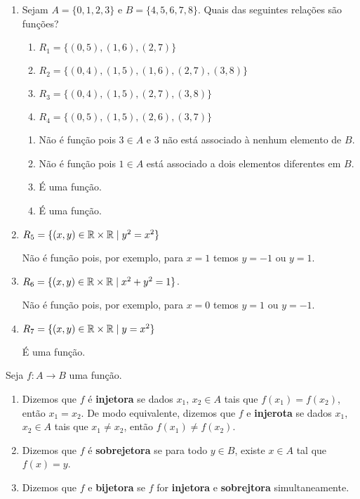 \begin{exemplos}
	\begin{enumerate}[label={\arabic*})]
	\item Sejam $A = \{0,1,2,3\}$ e $B = \{4,5,6,7,8\}$. Quais das seguintes rela{\c c}{\~o}es s{\~a}o fun{\c c}{\~o}es?
	\begin{enumerate}[label={\alph*})]
		\item $R_{1} = \{(0,5),(1,6),(2,7)\}$
		\item $R_{2} = \{(0,4),(1,5),(1,6),(2,7),(3,8)\}$
		\item $R_{3} = \{(0,4),(1,5),(2,7),(3,8)\}$
		\item $R_{4} = \{(0,5),(1,5),(2,6),(3,7)\}$
	\end{enumerate}
	\begin{solucao}
		\begin{enumerate}[label={\alph*})]
			\item Não é função pois $3 \in A$ e $3$ não está associado {\`a} nenhum elemento de $B$.
			\item Não é função pois $1 \in A$ está associado a dois elementos diferentes em $B$.
			\item É uma função.
			\item É uma função.
		\end{enumerate}
	\end{solucao}
	\item $R_{5} = \{(x,y) \in \mathbb{R}  \times \mathbb{R}  \mid y^2 = x^2\}$
	\begin{solucao}
	 	Não é função pois, por exemplo, para $x = 1$ temos $y = -1$ ou $y = 1$.
	 \end{solucao}
	\item $R_{6} = \{(x,y) \in \mathbb{R}  \times \mathbb{R}  \mid x^2 + y^2 = 1\}$.
	\begin{solucao}
	 	Não é função pois, por exemplo, para $x = 0$ temos $y = 1$ ou $y = -1$.
	 \end{solucao}
	\item  $R_{7} = \{(x,y) \in \mathbb{R}  \times \mathbb{R} \mid y = x^2\}$
	\begin{solucao}
	 	É uma função.
	\end{solucao}
	\end{enumerate}	
\end{exemplos}


\begin{definicao}
	Seja $f : A \to B$ uma função.
	\begin{enumerate}
		\item Dizemos que $f$ é \textbf{injetora} se dados $x_1$, $x_2 \in A$ tais que $f(x_1) = f(x_2)$, então $x_1 = x_2$. De modo equivalente, dizemos que $f$ e \textbf{injerota} se dados $x_1$, $x_2 \in A$ tais que $x_1 \ne x_2$, então $f(x_1) \ne f(x_2)$.
		\item Dizemos que $f$ é \textbf{sobrejetora} se para todo $y \in B$, existe $x \in A$ tal que $f(x) = y$.
		\item Dizemos que $f$ e \textbf{bijetora} se $f$ for \textbf{injetora} e \textbf{sobrejtora} simultaneamente.
	\end{enumerate}
\end{definicao}

